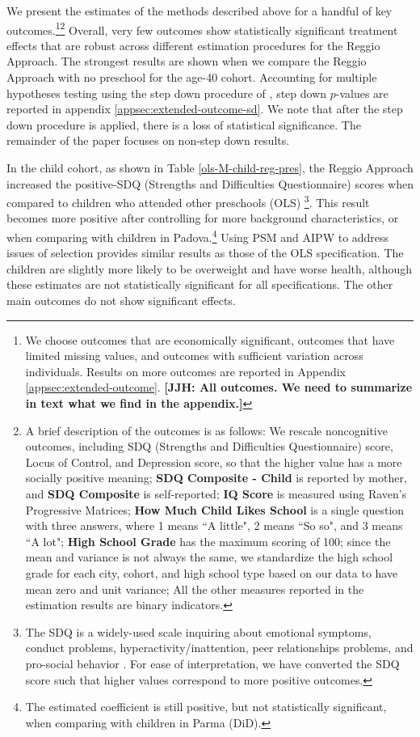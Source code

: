 We present the estimates of the methods described above for a handful of key outcomes.\footnote{We choose outcomes that are economically significant,  outcomes that have limited missing values, and outcomes with sufficient variation across individuals. Results on more outcomes are reported in Appendix \ref{appsec:extended-outcome}. \textbf{[JJH: All outcomes. We need to summarize in text what we find in the appendix.]}}\footnote{A brief description of the outcomes is as follows: We rescale noncognitive outcomes, including SDQ (Strengths and Difficulties Questionnaire) score, Locus of Control, and Depression score, so that the higher value has a more socially positive meaning; \textbf{SDQ Composite - Child} is reported by mother, and \textbf{SDQ Composite} is self-reported; \textbf{IQ Score} is measured using Raven's Progressive Matrices; \textbf{How Much Child Likes School} is a single question with three answers, where 1 means ``A little", 2 means ``So so", and 3 means ``A lot";  \textbf{High School Grade} has the maximum scoring of 100; since the mean and variance is not always the same, we standardize the high school grade for each city, cohort, and high school type based on our data to have mean zero and unit variance; All the other measures reported in the estimation results are binary indicators.} Overall, very few outcomes show statistically significant treatment effects that are robust across different estimation procedures for the Reggio Approach. The strongest results are shown when we compare the Reggio Approach with no preschool for the age-40 cohort. Accounting for multiple hypotheses testing using the step down procedure of \citet{Romano_Wolf_2005_E}, step down $p$-values are reported in appendix \ref{appsec:extended-outcome-sd}. We note that after the step down procedure is applied, there is a loss of statistical significance. The remainder of the paper focuses on non-step down results.

In the child cohort, as shown in Table \ref{ols-M-child-reg-pres}, the Reggio Approach increased the positive-SDQ (Strengths and Difficulties Questionnaire) scores when compared to children who attended other preschools (OLS) \footnote{The SDQ is a widely-used scale inquiring about emotional symptoms, conduct problems, hyperactivity/inattention, peer relationships problems, and pro-social behavior \citep{Goodman_1997_JCPP}. For ease of interpretation, we have converted the SDQ score such that higher values correspond to more positive outcomes.}. This result becomes more positive after controlling for more background characteristics, or when comparing with children in Padova.\footnote{The estimated coefficient is still positive, but not statistically significant, when comparing with children in Parma (DiD).} Using PSM and AIPW to address issues of selection provides similar results as those of the OLS specification. The children are slightly more likely to be overweight and have worse health, although these estimates are not statistically significant for all specifications. The other main outcomes do not show significant effects.

